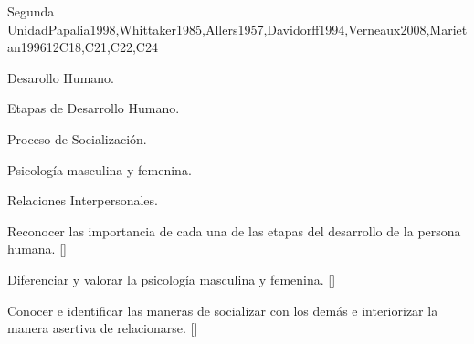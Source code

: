 \begin{syllabus}
\begin{unit}{}{Segunda Unidad}{Papalia1998,Whittaker1985,Allers1957,Davidorff1994,Verneaux2008,Marietan1996}{12}{C18,C21,C22,C24}
\begin{topics}
	\item Desarollo Humano.
	    \begin{subtopics}
		\item Etapas de Desarrollo Humano.
	    \end{subtopics}
	\item Proceso de Socialización.
	    \begin{subtopics}
		\item Psicología masculina y femenina.
		\item Relaciones Interpersonales.
	    \end{subtopics}
\end{topics}
\begin{learningoutcomes}
	\item Reconocer las importancia de cada una de las etapas del desarrollo de la persona humana. [\Familiarity]
	\item Diferenciar y valorar la psicología masculina y femenina. [\Familiarity]
	\item Conocer e identificar las maneras de socializar con los demás e interiorizar la manera asertiva de relacionarse. [\Familiarity]
\end{learningoutcomes}
\end{unit}


\end{syllabus}
